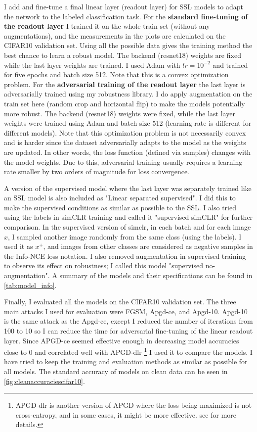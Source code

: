 \documentclass[../thesis.tex]{subfiles}
\begin{document}
	I add and fine-tune a final linear layer (readout layer) for SSL models to adapt the network to the labeled classification task. For the \textbf{standard fine-tuning of the readout layer} I trained it on the whole train set (without any augmentations), and the measurements in the plots are calculated on the CIFAR10 validation set. Using all the possible data gives the training method the best chance to learn a robust model. The backend (resnet18) weights are fixed while the last layer weights are trained. I used Adam with $lr=10^{-2}$ and trained for five epochs and batch size 512. Note that this is a convex optimization problem. For the \textbf{adversarial training of the readout layer} the last layer is adversarially trained using my robustness library. I do apply augmentation on the train set here (random crop and horizontal flip) to make the models potentially more robust. The backend (resnet18) weights were fixed, while the last layer weights were trained using Adam and batch size 512 (learning rate is different for different models). Note that this optimization problem is not necessarily convex and is harder since the dataset adversarially adapts to the model as the weights are updated. In other words, the loss function (defined via samples) changes with the model weights. Due to this, adversarial training usually requires a learning rate smaller by two orders of magnitude for loss convergence.      
	
	A version of the supervised model where the last layer was separately trained like an SSL model is also included as "Linear separated supervised". I did this to make the supervised conditions as similar as possible to the SSL. I also tried using the labels in simCLR training and called it "supervised simCLR" for further comparison. In the supervised version of simclr, in each batch and for each image $x$, I sampled another image randomly from the same class (using the labels). I used it as $x^+$, and images from other classes are considered as negative samples in the Info-NCE loss notation. I also removed augmentation in supervised training to observe its effect on robustness; I called this model "supervised no-augmentation". A summary of the models and their specifications can be found in \ref{tab:model_info}.
	
	Finally, I evaluated all the models on the CIFAR10 validation set. The three main attacks I used for evaluation were FGSM, Apgd-ce, and Apgd-10. Apgd-10 is the same attack as the Apgd-ce, except I reduced the number of iterations from 100 to 10 so I can reduce the time for adversarial fine-tuning of the linear readout layer. Since APGD-ce seemed effective enough in decreasing model accuracies close to 0 and correlated well with APGD-dlr \footnote{APGD-dlr is another version of APGD where the loss being maximized is not cross-entropy, and in some cases, it might be more effective. see \cite{autoattack} for more details.} I used it to compare the models. I have tried to keep the training and evaluation methods as similar as possible for all models. The standard accuracy of models on clean data can be seen in \ref{fig:cleanaccuraciescifar10}. 
	
\end{document}
